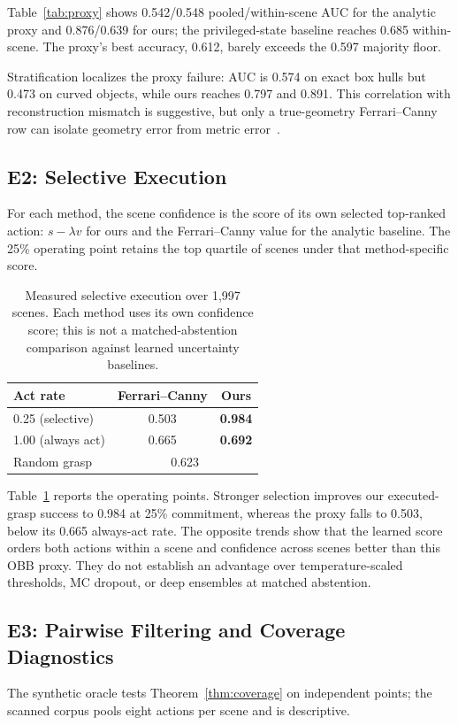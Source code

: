 \documentclass[letterpaper, 10pt, conference]{ieeeconf}
\begin{document}
Table~\ref{tab:proxy} shows 0.542/0.548 pooled/within-scene AUC for the
analytic proxy and 0.876/0.639 for ours; the privileged-state baseline reaches
0.685 within-scene. The proxy's best accuracy, 0.612, barely exceeds the
0.597 majority floor.

Stratification localizes the proxy failure: AUC is 0.574
on exact box hulls but 0.473 on curved objects, while ours reaches 0.797 and
0.891. This correlation with reconstruction mismatch is suggestive, but only
a true-geometry Ferrari--Canny row can isolate geometry error from metric
error~\cite{rubert2017relevance,lu2022hybrid}.

\subsection{E2: Selective Execution}
\label{sec:selective}
For each method, the scene confidence is the score of its own selected
top-ranked action: $s-\lambda v$ for ours and the Ferrari--Canny value for the
analytic baseline. The 25\% operating point retains the top quartile of scenes
under that method-specific score.

\begin{table}[t]
\centering
\caption{Measured selective execution over 1{,}997 scenes. Each method uses
its own confidence score; this is not a matched-abstention comparison against
learned uncertainty baselines.}
\label{tab:selective}
\begin{tabular}{lcc}
\toprule
Act rate & Ferrari--Canny & \textbf{Ours} \\
\midrule
0.25 (selective) & 0.503 & \textbf{0.984} \\
1.00 (always act) & 0.665 & \textbf{0.692} \\
\midrule
Random grasp & \multicolumn{2}{c}{0.623} \\
\bottomrule
\end{tabular}
\end{table}

Table~\ref{tab:selective} reports the operating points. Stronger selection
improves our executed-grasp success to 0.984 at 25\% commitment, whereas the
proxy falls to 0.503, below its 0.665 always-act rate. The opposite trends
show that the learned score orders both actions within a scene and confidence
across scenes better than this OBB proxy. They do not establish an advantage
over temperature-scaled thresholds, MC dropout, or deep ensembles at matched
abstention.

\subsection{E3: Pairwise Filtering and Coverage Diagnostics}
\label{sec:coverage-results}
The synthetic oracle tests Theorem~\ref{thm:coverage} on independent points;
the scanned corpus pools eight actions per scene and is descriptive.
\end{document}
